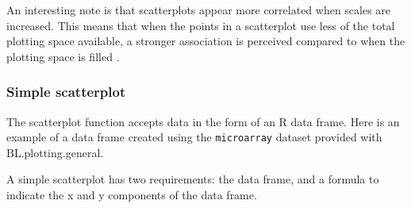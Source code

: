 \documentclass[letterpaper]{article}\usepackage[]{graphicx}\usepackage[]{color}
\begin{document}
An interesting note is that scatterplots appear more correlated when scales are increased. This means that when the points in a scatterplot use less of the total plotting space available, a stronger association is perceived compared to when the plotting space is filled \cite{cleveland-scatter}.

\subsubsection{Simple scatterplot}
The scatterplot function accepts data in the form of an R  data frame. Here is an example of a data frame created using the \verb|microarray| dataset provided with BL.plotting.general.

A simple scatterplot has two requirements: the data frame, and a formula to indicate the x and y components of the data frame.

\end{document}
